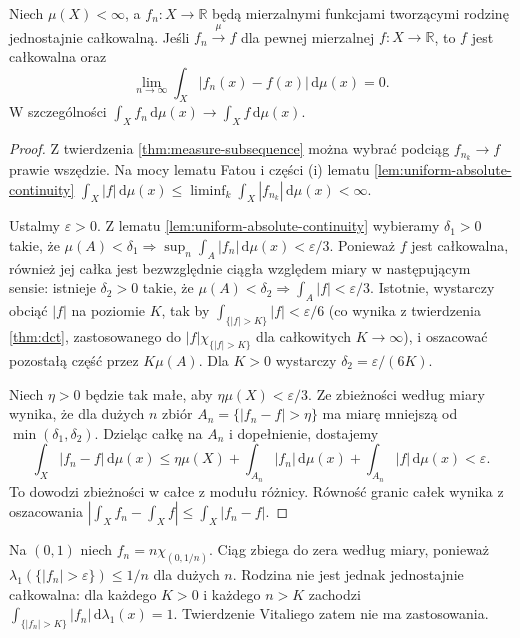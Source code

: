 \begin{twierdzenie}
\label{thm:vitali-l1}
Niech $\mu(X)<\infty$, a $f_n:X\to\mathbb R$ będą
mierzalnymi funkcjami tworzącymi rodzinę
jednostajnie całkowalną. Jeśli
$f_n\xrightarrow{\mu}f$ dla pewnej mierzalnej
$f:X\to\mathbb R$, to $f$ jest całkowalna oraz
\[
\lim_{n\to\infty}\int_X|f_n(x)-f(x)|\,\mathrm d\mu(x)=0.
\]
W szczególności $\int_Xf_n\,\mathrm d\mu(x)\to
\int_Xf\,\mathrm d\mu(x)$.
\end{twierdzenie}
\begin{proof}
Z twierdzenia \ref{thm:measure-subsequence}
można wybrać podciąg $f_{n_k}\to f$ prawie wszędzie.
Na mocy lematu Fatou i części (i) lematu
\ref{lem:uniform-absolute-continuity}
$\int_X|f|\,\mathrm d\mu(x)\le
\liminf_k\int_X|f_{n_k}|\,\mathrm d\mu(x)<\infty$.

Ustalmy $\varepsilon>0$. Z lematu
\ref{lem:uniform-absolute-continuity} wybieramy
$\delta_1>0$ takie, że
$\mu(A)<\delta_1\Rightarrow
\sup_n\int_A|f_n|\,\mathrm d\mu(x)<\varepsilon/3$.
Ponieważ $f$ jest całkowalna, również jej całka
jest bezwzględnie ciągła względem miary w następującym
sensie: istnieje $\delta_2>0$ takie, że
$\mu(A)<\delta_2\Rightarrow\int_A|f|<\varepsilon/3$.
Istotnie, wystarczy obciąć $|f|$ na poziomie $K$,
tak by $\int_{\{|f|>K\}}|f|<\varepsilon/6$
(co wynika z twierdzenia \ref{thm:dct}, zastosowanego do
$|f|\chi_{\{|f|>K\}}$ dla całkowitych $K\to\infty$),
i oszacować pozostałą część przez $K\mu(A)$.
Dla $K>0$ wystarczy $\delta_2=\varepsilon/(6K)$.

Niech $\eta>0$ będzie tak małe, aby
$\eta\mu(X)<\varepsilon/3$. Ze zbieżności według
miary wynika, że dla dużych $n$ zbiór
$A_n=\{|f_n-f|>\eta\}$ ma miarę mniejszą od
$\min(\delta_1,\delta_2)$. Dzieląc całkę na
$A_n$ i dopełnienie, dostajemy
\[
\int_X|f_n-f|\,\mathrm d\mu(x)
\le\eta\mu(X)+\int_{A_n}|f_n|\,\mathrm d\mu(x)
+\int_{A_n}|f|\,\mathrm d\mu(x)<\varepsilon.
\]
To dowodzi zbieżności w całce z modułu różnicy.
Równość granic całek wynika z oszacowania
$|\int_X f_n-\int_X f|\le\int_X|f_n-f|$.
\end{proof}

\begin{przyklad}
Na $(0,1)$ niech $f_n=n\chi_{(0,1/n)}$.
Ciąg zbiega do zera według miary, ponieważ
$\lambda_1(\{|f_n|>\varepsilon\})\le1/n$
dla dużych $n$. Rodzina nie jest jednak jednostajnie
całkowalna: dla każdego $K>0$ i każdego $n>K$
zachodzi
$\int_{\{|f_n|>K\}}|f_n|\,\mathrm d\lambda_1(x)=1$.
Twierdzenie Vitaliego zatem nie ma zastosowania.
\end{przyklad}

